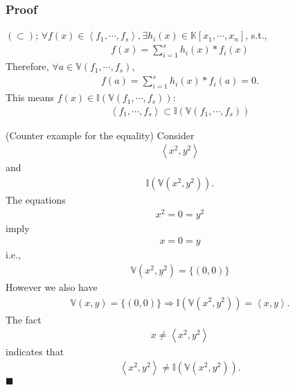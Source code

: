 \documentclass[11pt]{book}
\begin{document}
\subsubsection{Proof}
$(\subset)$; $\forall f(x) \in \left< f_1, \cdots, f_s \right>, \exists h_i(x) \in \mathbb{K}[x_1,\cdots,x_n]$, s.t.,
\begin{eqnarray}
f(x) = \sum_{i=1}^s h_i(x) * f_i(x)
\end{eqnarray}
Therefore, $\forall a \in \mathbb{V} \left( f_1, \cdots, f_s \right)$,
\begin{eqnarray}
f(a) = \sum_{i=1}^s h_i(x) * f_i(a) = 0.
\end{eqnarray}
This means $f(x) \in \mathbb{I}\left( \mathbb{V} \left( f_1, \cdots, f_s \right) \right)$:
\begin{eqnarray}
\left< f_1, \cdots, f_s \right> \subset \mathbb{I}\left( \mathbb{V} \left( f_1, \cdots, f_s \right) \right)
\end{eqnarray}

(Counter example for the equality)
Consider
\begin{eqnarray}
\left< x^2, y^2 \right>
\end{eqnarray}
and 
\begin{eqnarray}
\mathbb{I}\left( \mathbb{V} \left( x^2, y^2 \right) \right).
\end{eqnarray}
The equations
\begin{eqnarray}
x^2 = 0 = y^2
\end{eqnarray}
imply
\begin{eqnarray}
x = 0 = y
\end{eqnarray}
i.e.,
\begin{eqnarray}
\mathbb{V} \left( x^2, y^2 \right) = \{(0,0)\}
\end{eqnarray}
However we also have
\begin{eqnarray}
\mathbb{V} \left( x, y \right) = \{(0,0)\} \Rightarrow \mathbb{I}\left( \mathbb{V} \left( x^2, y^2 \right) \right) = \left< x, y \right>.
\end{eqnarray}
The fact
\begin{eqnarray}
x \neq \left< x^2, y^2 \right>
\end{eqnarray}
indicates that
\begin{eqnarray}
\left< x^2, y^2 \right> \neq \mathbb{I}\left( \mathbb{V} \left( x^2, y^2 \right) \right).
\end{eqnarray}
$\blacksquare$
\end{document}

